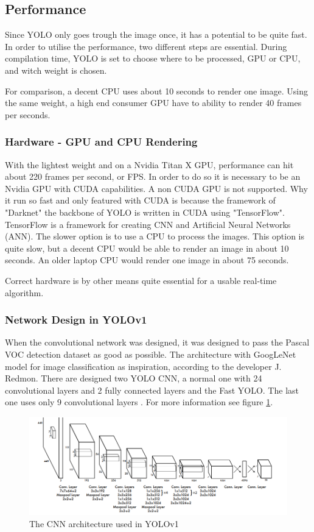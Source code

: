 \subsection{Performance}
Since YOLO only goes trough the image once, it has a potential to be quite fast. In order to utilise the performance, two different steps are essential. During compilation time, YOLO is set to choose where to be processed, GPU or CPU, and witch weight is chosen.

For comparison, a decent CPU uses about 10 seconds to render one image. Using the same weight, a high end consumer GPU have to ability to render 40 frames per seconds. \cite{yolo_res}
\subsubsection*{Hardware - GPU and CPU Rendering}
With the lightest weight and on a Nvidia Titan X GPU, performance can hit about 220 frames per second, or FPS. In order to do so it is necessary to be an Nvidia GPU with CUDA capabilities. A non CUDA GPU is not supported. Why it run so fast and only featured with CUDA is because the framework of "Darknet" the backbone of YOLO is written in CUDA using "TensorFlow". TensorFlow is a framework for creating CNN and Artificial Neural Networks (ANN). The slower option is to use a CPU to process the images. This option is quite slow, but a decent CPU would be able to render an image in about 10 seconds. An older laptop CPU would render one image in about 75 seconds. 

Correct hardware is by other means quite essential for a usable real-time algorithm. 
\subsubsection*{Network Design in YOLOv1}
When the convolutional network was designed, it was designed to pass the Pascal VOC detection dataset as good as possible. The architecture with GoogLeNet model for image classification as inspiration, according to the developer J. Redmon. There are designed two YOLO CNN, a normal one with 24 convolutional layers and 2 fully connected layers and the Fast YOLO. The last one uses only 9 convolutional layers \cite{YOLO}. For more information see figure \ref{fig:yolo_Convnet}.

\begin{figure}
    \centering
        \includegraphics[width=15cm]{img/yolo_CONVnet.png}
    \caption{The CNN architecture used in YOLOv1 \cite{YOLO} }
    \label{fig:yolo_Convnet}
\end{figure}

